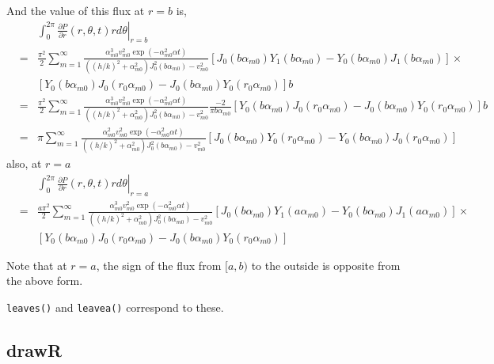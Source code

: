 \documentclass{article}
\newcommand{\inlinecode}[1]{{\colorbox[rgb]{0.9,0.9,0.9}{\lstinline|#1|}}}
\begin{document}
%
And the value of this flux at $r=b$ is,
%
\begin{eqnarray}
    & & \left.
    \int_0^{2\pi}\frac{\partial P}{\partial r}(r, \theta, t)rd\theta
    \right|_{r=b}
\nonumber\\
    &=& \frac{\pi^2}{2} \sum_{m=1}^{\infty}
    \frac{\alpha_{m0}^3 v_{m0}^2 \exp(-\alpha_{m0}^2\alpha t)}
         {((h/k)^2 + \alpha_{m0}^2)J_0^2(b\alpha_{m0}) - v_{m0}^2}
    \left[
        J_0(b\alpha_{m0})Y_1(b\alpha_{m0}) - Y_0(b\alpha_{m0})J_1(b\alpha_{m0})
    \right]\times
\nonumber\\
    & & \left[
        Y_0(b\alpha_{m0}) J_0(r_0\alpha_{m0}) - J_0(b\alpha_{m0}) Y_0(r_0\alpha_{m0})
    \right] b
\nonumber\\
    &=& \frac{\pi^2}{2} \sum_{m=1}^{\infty}
    \frac{\alpha_{m0}^3 v_{m0}^2 \exp(-\alpha_{m0}^2\alpha t)}
         {((h/k)^2 + \alpha_{m0}^2)J_0^2(b\alpha_{m0}) - v_{m0}^2}
    \frac{-2}{\pi b\alpha_{m0}}
    \left[
        Y_0(b\alpha_{m0}) J_0(r_0\alpha_{m0}) - J_0(b\alpha_{m0}) Y_0(r_0\alpha_{m0})
    \right]b
\nonumber\\
    &=& \pi \sum_{m=1}^{\infty}
    \frac{\alpha_{m0}^2 v_{m0}^2 \exp(-\alpha_{m0}^2\alpha t)}
         {((h/k)^2 + \alpha_{m0}^2)J_0^2(b\alpha_{m0}) - v_{m0}^2}
    \left[
        J_0(b\alpha_{m0}) Y_0(r_0\alpha_{m0}) - Y_0(b\alpha_{m0}) J_0(r_0\alpha_{m0})
    \right]
\end{eqnarray}
%
also, at $r=a$
%
\begin{eqnarray}
    & & \left.
    \int_0^{2\pi}\frac{\partial P}{\partial r}(r, \theta, t)rd\theta
    \right|_{r=a}
\nonumber\\
    &=& \frac{a\pi^2}{2} \sum_{m=1}^{\infty}
    \frac{\alpha_{m0}^3 v_{m0}^2 \exp(-\alpha_{m0}^2\alpha t)}
         {((h/k)^2 + \alpha_{m0}^2)J_0^2(b\alpha_{m0}) - v_{m0}^2}
    \left[
        J_0(b\alpha_{m0})Y_1(a\alpha_{m0}) - Y_0(b\alpha_{m0})J_1(a\alpha_{m0})
    \right] \times
\nonumber\\
    & & \left[
        Y_0(b\alpha_{m0}) J_0(r_0\alpha_{m0}) - J_0(b\alpha_{m0}) Y_0(r_0\alpha_{m0})
    \right]
\end{eqnarray}

Note that at $r=a$, the sign of the flux from $[a, b)$ to the outside is opposite from the above form.

\inlinecode{leaves()} and \inlinecode{leavea()} correspond to these.

\subsection{drawR}
\end{document}
